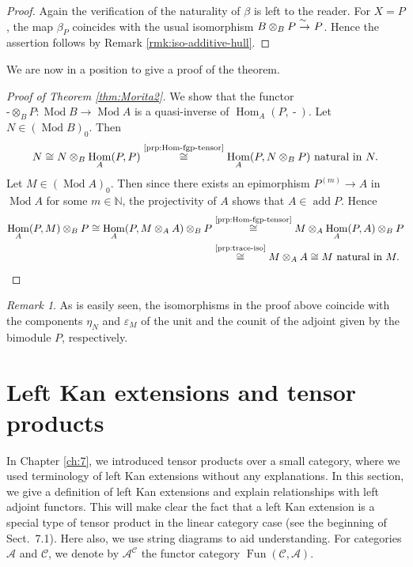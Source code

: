 \documentclass{surv-l}
\numberwithin{equation}{chapter}
\numberwithin{figure}{chapter}
\theoremstyle{plain}
\theoremstyle{definition}
\theoremstyle{remark}
\newtheorem{rmk}[thm]{Remark}
\newcommand{\isoto}{\
  \raise.8ex\hbox{$^{\sim}$}\kern-.7em\hbox{$\to$}\ }
\DeclareMathOperator{\Hom}{Hom}
\DeclareMathOperator{\Mod}{Mod}
\DeclareMathOperator{\add}{add}
\DeclareMathOperator{\blank}{-}
\DeclareMathOperator{\Fun}{Fun}
\begin{document}
\begin{proof}
Again the verification of the naturality of $\beta$ is left to the reader.
For $X = P$, the map $\beta_P$ coincides with the usual isomorphism $B \otimes_B P \isoto P$.
Hence the assertion follows by Remark \ref{rmk:iso-additive-hull}.
\end{proof}

We are now in a position to give a proof of the theorem.



\begin{proof}[Proof of Theorem \ref{thm:Morita2}]
We show that the functor {\small$\blank \otimes_B P \colon  \Mod B \to \Mod A$} is a quasi-inverse of $\Hom_A(P, \blank)$.
Let $N \in (\Mod B)_0$.
Then
\[
N \cong N \otimes_B \Hom_A(P,P) \overset{\text{\ref{prp:Hom-fgp-tensor}}}{\cong} \Hom_A(P, N \otimes_B P)\ \text{natural in } N.
\]
Let $M \in (\Mod A)_0$.
Then since there exists an epimorphism $P^{(m)} \to A$ in $\Mod A$ for some $m \in \mathbb{N}$,
the projectivity of $A$ shows that $A \in \add P$. Hence
\[
\begin{aligned}
\Hom_A(P,M) \otimes_B P \cong \Hom_A(P, M \otimes_A A) \otimes_B P
&\overset{\text{\ref{prp:Hom-fgp-tensor}}}{\cong} M \otimes_A \Hom_A(P, A) \otimes_B P\\
&\overset{\text{\ref{prp:trace-iso}}}{\cong} M \otimes_A A \cong M \ \text{natural in } M.
\end{aligned}
\]
\end{proof}


\begin{rmk}
As is easily seen, the isomorphisms in the proof above coincide with
the components $\eta_N$ and $\varepsilon_M$ of the unit and the counit of the adjoint given by the bimodule $P$, respectively.
\end{rmk}

\section{Left Kan extensions and tensor products}\label{app:b.5}
In Chapter \ref{ch:7}, we introduced tensor products over a small category,
where we used terminology of left Kan extensions without any explanations.
In this section, we give a definition of left Kan extensions and explain relationships with
left adjoint functors.
This will make clear the fact that a left Kan extension
is a special type of tensor product in the linear category case
(see the beginning of Sect.\ 7.1).
Here also, we use string diagrams to aid understanding.
For categories $\mathcal{A}$ and ${\mathcal{C}}$, we denote by $\mathcal{A}^{{\mathcal{C}}}$
the functor category $\Fun({\mathcal{C}}, \mathcal{A})$.
\end{document}
